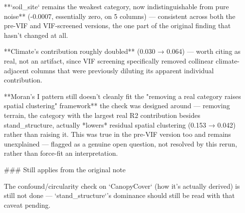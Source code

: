 **`soil_site` remains the weakest category, now indistinguishable from pure noise** (-0.0007,
essentially zero, on 5 columns) — consistent across both the pre-VIF and VIF-screened versions,
the one part of the original finding that hasn't changed at all.

**Climate's contribution roughly doubled** (0.030 → 0.064) — worth citing as real, not an
artifact, since VIF screening specifically removed collinear climate-adjacent columns that were
previously diluting its apparent individual contribution.

**Moran's I pattern still doesn't cleanly fit the "removing a real category raises spatial
clustering" framework** the check was designed around — removing terrain, the category with the
largest real R2 contribution besides stand_structure, actually *lowers* residual spatial
clustering (0.153 → 0.042) rather than raising it. This was true in the pre-VIF version too and
remains unexplained — flagged as a genuine open question, not resolved by this rerun, rather than
force-fit an interpretation.

### Still applies from the original note

The confound/circularity check on `CanopyCover` (how it's actually derived) is still not done —
`stand_structure`'s dominance should still be read with that caveat pending.

